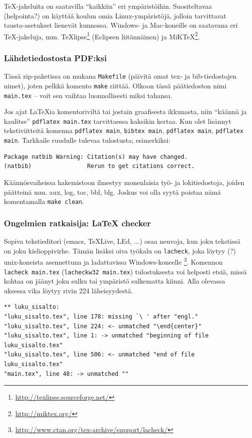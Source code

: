TeX-jakeluita on saatavilla ``kaikkiin'' eri ympäristöihin.
Suositeltavaa (helpointa?) on käyttää koulun omia Linux-ympäristöjä,
jolloin tarvittavat tausta-asetukset lienevät kunnossa.  Windows- ja
Mac-koneille on saatavana eri TeX-jakeluja, mm.
TeXlipse\footnote{\url{http://texlipse.sourceforge.net/}} (Eclipsen
liitännäinen) ja MiKTeX\footnote{\url{http://miktex.org/}}.

\subsubsection{Lähdetiedostosta PDF:ksi}
\label{sec:esimkaannos}

Tässä zip-paketissa on mukana \verb!Makefile! (päivitä
omat tex- ja bib-tiedostojen nimet), joten pelkkä komento
\verb!make! riittää. Olkoon tässä päätiedoston nimi \verb!main.tex! --
voit sen vaihtaa luonnollisesti miksi tahansa.

Jos ajat \LaTeX{}ia komentoriviltä tai jostain graafisesta ikkunasta,
niin ``käännä ja kaulitse'' \verb!pdflatex main.tex! tarvittaessa kaksikin
kertaa. Kun olet lisännyt tekstiviitteitä komenna \verb!pdflatex main!,
\verb!bibtex main!, \verb!pdflatex main!, \verb!pdflatex main!. Tarkkaile
ruudulle tulevaa tulostusta; esimerkiksi:
%
\begin{verbatim}
Package natbib Warning: Citation(s) may have changed.
(natbib)                Rerun to get citations correct.
\end{verbatim}

Käännösvaiheissa hakemistoon ilmestyy monenlaisia työ- ja 
lokitiedostoja, joiden päätteinä mm. aux, log, toc, bbl, blg.
Joskus voi olla syytä poistaa nämä komentamalla \verb!make clean!.

\subsubsection{Ongelmien ratkaisija: \LaTeX{} checker}
\label{sec:esimlacheck}

Sopiva tekstieditori (emacs, TeXLive, LEd, $\ldots$) osaa
neuvoja, kun joku tekstissä on joku kielioppivirhe. Tämän 
lisäksi oiva työkalu on \verb!lacheck!, joka löytyy (?)
unix-koneista asennettuna ja ladattavissa 
Windows-koneelle%
\footnote{\url{http://www.ctan.org/tex-archive/support/lacheck/}}.
Komennon \verb!lacheck main.tex! (\verb!lacheckw32 main.tex!)
tulostuksesta voi helposti etsiä, missä kohtaa on jäänyt joku
sulku tai ympäristö sulkematta kiinni. Alla olevassa 
uksessa
vika löytyy rivin 224 läheisyydestä.
%
\small
\begin{verbatim}
** luku_sisalto:
"luku_sisalto.tex", line 178: missing `\ ' after "engl."
"luku_sisalto.tex", line 224: <- unmatched "\end{center}"
"luku_sisalto.tex", line 1: -> unmatched "beginning of file luku_sisalto.tex"
"luku_sisalto.tex", line 506: <- unmatched "end of file luku_sisalto.tex"
"main.tex", line 48: -> unmatched ""
\end{verbatim}
\normalsize

